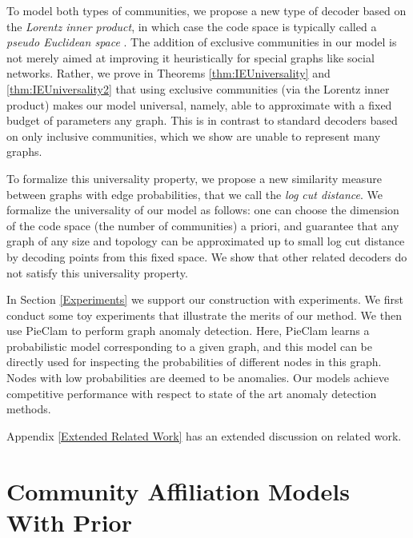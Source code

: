 \documentclass[letterpaper]{article} %
\begin{document}
To model both types of communities, we propose a new type of decoder based on the \emph{Lorentz inner product}, in which case the code space is typically called a \emph{pseudo Euclidean space} \cite{greub1963pseudo}. The addition of exclusive communities in our model is not merely aimed at improving it heuristically for special graphs like social networks. Rather, we prove in Theorems \ref{thm:IEUniversality} and \ref{thm:IEUniversality2} that using exclusive communities (via the Lorentz inner product) makes our model universal, namely, able to approximate with a fixed budget of parameters any graph. This is in contrast to standard decoders based on only inclusive communities, which we show are unable to represent many graphs. %

To formalize this universality property, we propose a new similarity measure between graphs with edge probabilities, that we call the \emph{log cut distance}. We formalize the universality of our model as follows: one can choose the dimension of the code space (the number of communities)  a priori, and guarantee that any graph of any size and topology can be approximated up to small log cut distance by decoding points from this fixed space. We show that other related decoders do not satisfy this universality property. 

In Section \ref{Experiments} we support our construction with experiments.
We first conduct some toy experiments that illustrate the merits of our method.
We then use PieClam to perform graph anomaly detection. Here, PieClam learns a probabilistic model corresponding to a given graph, and this model can be directly used for inspecting the probabilities of different nodes in this graph. Nodes with low probabilities are deemed to be anomalies. Our models achieve competitive performance with respect to state of the art anomaly detection methods.


%


Appendix \ref{Extended Related Work} has 
an extended discussion on related work.

\section{Community Affiliation Models With Prior}
\end{document}
